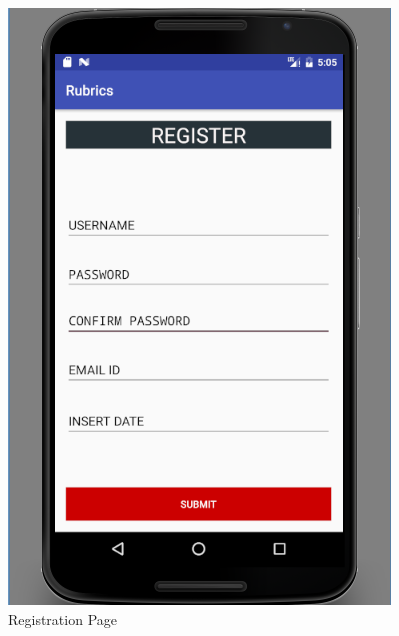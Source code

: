 \begin{figure}[!h]
\begin{minipage}[t]{0.5\linewidth}
\hfill\includegraphics[scale=.65]{project/images/registernew}\hspace*{\fill}
    \caption{Registration Page}
    \label{f2}
\end{minipage}        
\end{figure}  

